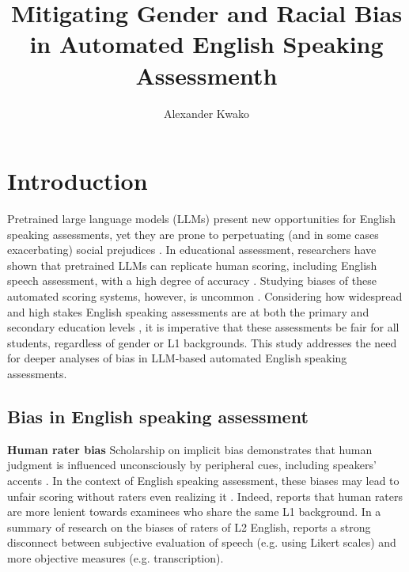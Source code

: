 \documentclass [PhD] {uclathes}
\title          {Mitigating Gender and Racial Bias \\
                in Automated English Speaking Assessmenth}
\author         {Alexander Kwako}
\begin{document}
\makeintropages

%
%

\chapter{Introduction}

Pretrained large language models (LLMs) present new opportunities for English speaking assessments, yet they are prone to perpetuating (and in some cases exacerbating) social prejudices \citep{blodgett2020}. In educational assessment, researchers have shown that pretrained LLMs can replicate human scoring, including English speech assessment, with a high degree of accuracy \citep{wang2021automated}. Studying biases of these automated scoring systems, however, is uncommon \citep{ormerod2022short}. Considering how widespread and high stakes English speaking assessments are at both the primary and secondary education levels \cite{cimpian2017, ets2005}, it is imperative that these assessments be fair for all students, regardless of gender or L1 backgrounds. This study addresses the need for deeper analyses of bias in LLM-based automated English speaking assessments. 

\section{Bias in English speaking assessment}

\noindent \textbf{Human rater bias}\; 
Scholarship on implicit bias demonstrates that human judgment is influenced unconsciously by peripheral cues, including speakers’ accents \citep{kang2021social}. In the context of English speaking assessment, these biases may lead to unfair scoring without raters even realizing it \citep{greenwald1995}. Indeed, \citet{winke2013} reports that human raters are more lenient towards examinees who share the same L1 background. In a summary of research on the biases of raters of L2 English, \citet{lindemann2013reliably} reports a strong disconnect between subjective evaluation of speech (e.g. using Likert scales) and more objective measures (e.g. transcription). 
\end{document}
